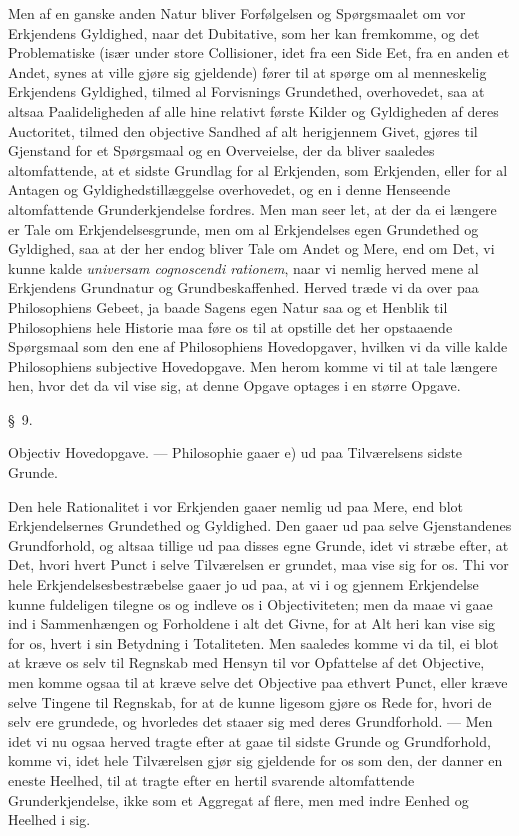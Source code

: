 \documentclass[12pt,a4paper]{book}
\newcommand{\apage}[1]{\marginnote{\footnotesize\textit{[#1]}}}
\begin{document}
Men af en ganske anden Natur bliver Forfølgelsen og Spørgsmaalet om vor
Erkjendens Gyldighed, naar det Dubitative, som her kan fremkomme, og det
Problematiske (især under store Collisioner, idet fra een Side Eet, fra en anden
et Andet, synes at ville gjøre sig gjeldende) fører til at spørge om al menneskelig
Erkjendens Gyldighed, tilmed al Forvisnings Grundethed, overhovedet, saa at altsaa
Paalideligheden af alle hine relativt første Kilder \apage{27}  og Gyldigheden af deres
Auctoritet, tilmed den objective Sandhed af alt herigjennem Givet, gjøres til
Gjenstand for et Spørgsmaal og en Overveielse, der da bliver saaledes altomfattende,
at et sidste Grundlag for al Erkjenden, som Erkjenden, eller for al Antagen og
Gyldighedstillæggelse overhovedet, og en i denne Henseende altomfattende
Grunderkjendelse fordres. Men man seer let, at der da ei længere er Tale om
Erkjendelsesgrunde, men om al Erkjendelses egen Grundethed og Gyldighed, saa at
der her endog bliver Tale om Andet og Mere, end om Det, vi kunne kalde
\textit{universam cognoscendi rationem}, naar vi nemlig herved mene al Erkjendens
Grundnatur og Grundbeskaffenhed. Herved træde vi da over paa Philosophiens Gebeet,
ja baade Sagens egen Natur saa og et Henblik til Philosophiens hele Historie maa
føre os til at opstille det her opstaaende Spørgsmaal som den ene af Philosophiens
Hovedopgaver, hvilken vi da ville kalde Philosophiens subjective Hovedopgave. Men
herom komme vi til at tale længere hen, hvor det da vil vise sig, at denne Opgave
optages i en større Opgave.

\begin{center}\large\S~9.\end{center}
\begin{center}Objectiv Hovedopgave. --- Philosophie gaaer e) ud paa Tilværelsens
sidste Grunde.\end{center}

Den hele Rationalitet i vor Erkjenden gaaer nemlig ud paa Mere, end blot
Erkjendelsernes Grundethed og Gyldighed. Den gaaer ud paa selve Gjenstandenes
Grundforhold, og altsaa tillige ud paa disses egne Grunde, idet vi stræbe efter,
at Det, hvori hvert Punct i selve Tilværelsen er grundet, maa vise sig for os. Thi
vor hele Erkjendelsesbestræbelse gaaer jo ud paa, at vi i og gjennem Erkjendelse
kunne fuldeligen tilegne os og indleve os i Objectiviteten; men da maae vi gaae
ind i Sammenhængen og Forholdene i alt det Givne, for at Alt heri kan vise sig for
os, hvert i sin Betydning i Totaliteten. Men saaledes komme vi da til, ei blot at
kræve os selv til Regnskab med Hensyn \apage{28}  til vor Opfattelse af det Objective, men
komme ogsaa til at kræve selve det Objective paa ethvert Punct, eller kræve selve
Tingene til Regnskab, for at de kunne ligesom gjøre os Rede for, hvori de selv ere
grundede, og hvorledes det staaer sig med deres Grundforhold. --- Men idet vi nu
ogsaa herved tragte efter at gaae til sidste Grunde og Grundforhold, komme vi,
idet hele Tilværelsen gjør sig gjeldende for os som den, der danner en eneste
Heelhed, til at tragte efter en hertil svarende altomfattende Grunderkjendelse,
ikke som et Aggregat af flere, men med indre Eenhed og Heelhed i sig.
\end{document}
